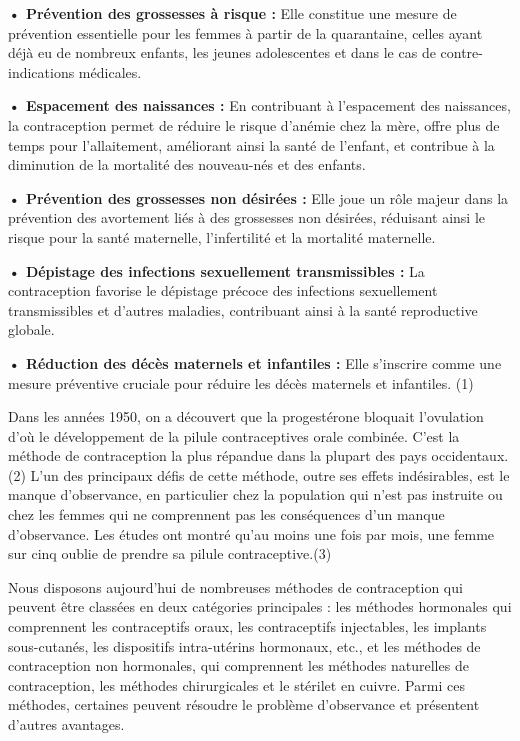 \begin{tcolorbox}[colback=white, colframe=white]
  \textbf{•	Prévention des grossesses à risque : }Elle constitue une mesure de prévention essentielle pour les femmes à partir de la quarantaine, celles ayant déjà eu de nombreux enfants, les jeunes adolescentes et dans le cas de contre-indications médicales.\vspace*{1em}

  \textbf{•	Espacement des naissances : }En contribuant à l’espacement des naissances, la contraception permet de réduire le risque d’anémie chez la mère, offre plus de temps pour l’allaitement, améliorant ainsi la santé de l’enfant, et contribue à la diminution de la mortalité des nouveau-nés et des enfants.\vspace*{1em}

  \textbf{•	Prévention des grossesses non désirées : }Elle joue un rôle majeur dans la prévention des avortement liés à des grossesses non désirées, réduisant ainsi le risque pour la santé maternelle, l’infertilité et la mortalité maternelle.  \vspace*{1em}

  \textbf{•	Dépistage des infections sexuellement transmissibles :}   La contraception favorise le dépistage précoce des infections sexuellement transmissibles et d’autres maladies, contribuant ainsi à la santé reproductive globale. \vspace*{1em}

  \textbf{•	Réduction des décès maternels et infantiles : } Elle s’inscrire comme une mesure préventive cruciale pour réduire les décès maternels et infantiles. (1) \vspace*{1em}
  
  \end{tcolorbox}

\noindent Dans les années 1950, on a découvert que la progestérone bloquait l’ovulation d’où le développement de la pilule contraceptives orale combinée. C’est la méthode de contraception la plus répandue dans la plupart des pays occidentaux.(2) L’un des principaux défis de cette méthode, outre ses effets indésirables, est le manque d’observance, en particulier chez la population qui n’est pas instruite ou chez les femmes qui ne comprennent pas les conséquences d’un manque d’observance. Les études ont montré qu’au moins une fois par mois, une femme sur cinq oublie de prendre sa pilule contraceptive.(3) \vspace*{1em}
 
\noindent Nous disposons aujourd’hui de nombreuses méthodes de contraception qui peuvent être classées en deux catégories principales : les méthodes hormonales qui comprennent les contraceptifs oraux, les contraceptifs injectables, les implants sous-cutanés, les dispositifs intra-utérins hormonaux, etc., et les méthodes de contraception non hormonales, qui comprennent les méthodes naturelles de contraception, les méthodes chirurgicales et le stérilet en cuivre. Parmi ces méthodes, certaines peuvent résoudre le problème d’observance et présentent d’autres avantages. \vspace*{1em}

